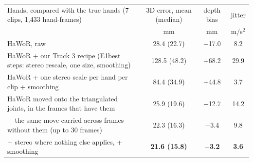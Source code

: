 \documentclass[10pt]{article}
\begin{document}
\begin{table}[H]\small\centering
\setlength{\tabcolsep}{4pt}
\begin{tabular}{@{}lccc@{}}
\toprule
Hands, compared with the true hands (7 clips, 1{,}433 hand-frames) & 3D error, mean (median) & depth bias & jitter \\
& mm & mm & m/s$^2$ \\
\midrule
HaWoR, raw & 28.4 (22.7) & $-$17.0 & 8.2 \\
HaWoR + our Track 3 recipe (E1best steps: stereo rescale, one size, smoothing) & 128.5 (48.2) & +68.2 & 29.9 \\
HaWoR + one stereo scale per hand per clip + smoothing & 84.4 (34.9) & +44.8 & 3.7 \\
HaWoR moved onto the triangulated joints, in the frames that have them & 25.9 (19.6) & $-$12.7 & 14.2 \\
\quad + the same move carried across frames without them (up to 30 frames) & 22.3 (16.3) & $-$3.4 & 9.8 \\
\quad + stereo where nothing else applies, + smoothing & \textbf{21.6 (15.8)} & \textbf{$-$3.2} & \textbf{3.6} \\
\bottomrule
\end{tabular}
\end{table}
\vspace{-4pt}
\end{document}
